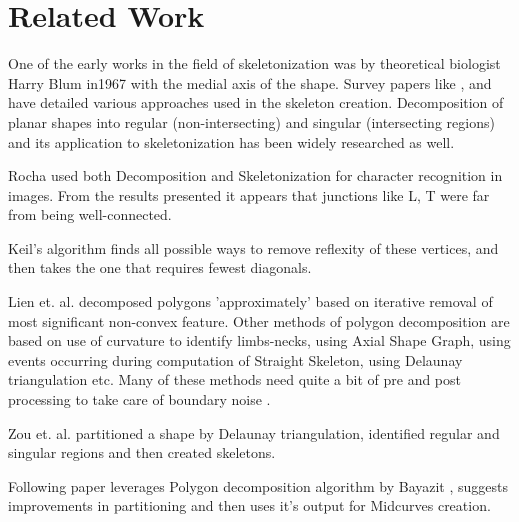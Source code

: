 
\section{Related Work}	

One of the early works in the field of skeletonization was by theoretical biologist Harry Blum in1967 \cite{Harry1967} with the medial axis of the shape. Survey papers like \cite{Attali2004}, \cite{Lam1992} and \cite{Yogesh2010} have detailed various approaches used in the skeleton creation. Decomposition of planar shapes  into regular (non-intersecting) and singular (intersecting regions) and its application to skeletonization has been widely researched \cite{Rocha99} as well.

Rocha \cite{Rocha98, Rocha99} used both Decomposition and Skeletonization for character recognition in images. From the results presented it appears that junctions like L, T were far from being well-connected. 

Keil's algorithm \cite{Keil94} finds all possible ways to remove reflexity  of  these  vertices,  and  then  takes  the  one  that  requires  fewest diagonals. 

Lien et. al. \cite{Lien2004} decomposed polygons 'approximately' based on iterative removal of most significant non-convex feature. Other methods of polygon decomposition are based on use of curvature to identify limbs-necks, using Axial Shape Graph, using events occurring during computation of Straight Skeleton, using Delaunay triangulation etc. Many of these methods need quite a bit of pre and post processing to take care of boundary noise \cite{Lien2004}. 

Zou et. al.\cite{Zou2001} partitioned a shape by Delaunay triangulation, identified regular and singular regions and then created skeletons.

Following paper leverages Polygon decomposition algorithm by Bayazit \cite{Bayazit}, suggests improvements in partitioning and then uses it's output for Midcurves creation.

